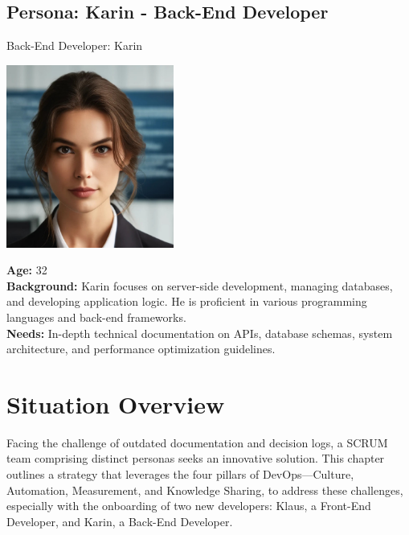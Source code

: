 \subsection*{Persona: Karin - Back-End Developer}
\begin{persona}{Back-End Developer: Karin}
\begin{tcbraster}[raster columns=2, raster column skip=5mm]
  \begin{tcolorbox}[width=0.2\linewidth, colback=white, colframe=white, boxrule=0pt, halign=center]
   \includegraphics[width=\linewidth, height=6cm, keepaspectratio]{Images/Karin.jpg}
  \end{tcolorbox}
  \begin{tcolorbox}[width=0.8\linewidth, colback=white, colframe=white, boxrule=0pt]
    \textbf{Age:} 32\\
    \textbf{Background:} Karin focuses on server-side development, managing databases, and developing application logic. He is proficient in various programming languages and back-end frameworks.\\
    \textbf{Needs:} In-depth technical documentation on APIs, database schemas, system architecture, and performance optimization guidelines.
  \end{tcolorbox}
\end{tcbraster}
\end{persona}


\section{Situation Overview}

Facing the challenge of outdated documentation and decision logs, a SCRUM team comprising distinct personas seeks an innovative solution. This chapter outlines a strategy that leverages the four pillars of DevOps—Culture, Automation, Measurement, and Knowledge Sharing, to address these challenges, especially with the onboarding of two new developers: Klaus, a Front-End Developer, and Karin, a Back-End Developer.

